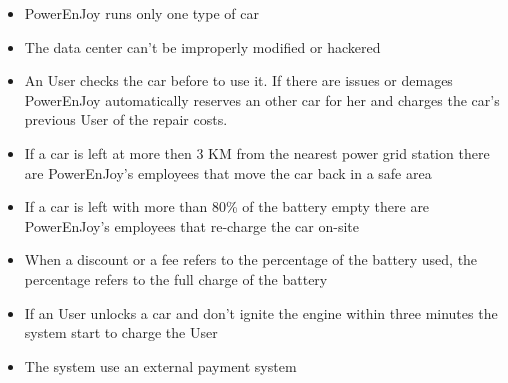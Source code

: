\begin{itemize}
	\item{PowerEnJoy runs only one type of car}
	\item{The data center can't be improperly modified or hackered}
	\item{An User checks the car before to use it. If there are issues or demages PowerEnJoy automatically reserves an other car for her and charges the car's previous User of the repair costs.}
	\item{If a car is left at more then 3 KM from the nearest power grid station there are PowerEnJoy's employees that move the car back in a \gls{safe area}}
	\item{If a car is left with more than 80\% of the battery empty there are PowerEnJoy's employees that re­‐charge the car on-­site}
	\item{When a discount or a fee refers to the percentage of the battery used, the percentage refers to the full charge of the battery}
	\item{If an User unlocks a car and don't ignite the engine within three minutes the system start to charge the User}%
	\item{The system use an external payment system}
	
\end{itemize}
